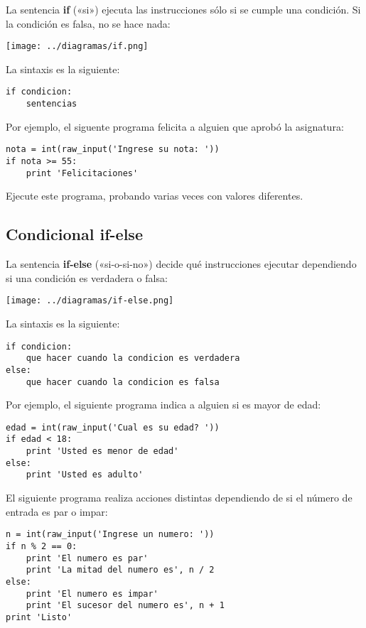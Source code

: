 La sentencia \textbf{if} («si») ejecuta las instrucciones sólo si se
cumple una condición. Si la condición es falsa, no se hace nada:

\texttt{[image: ../diagramas/if.png]}

La sintaxis es la siguiente:

\begin{lstlisting}
if condicion:
    sentencias
\end{lstlisting}

Por ejemplo, el siguente programa felicita a alguien que aprobó la
asignatura:

\begin{lstlisting}
nota = int(raw_input('Ingrese su nota: '))
if nota >= 55:
    print 'Felicitaciones'
\end{lstlisting}

Ejecute este programa, probando varias veces con valores diferentes.

\subsection{Condicional if-else}

La sentencia \textbf{if-else} («si-o-si-no») decide qué instrucciones
ejecutar dependiendo si una condición es verdadera o falsa:

\texttt{[image: ../diagramas/if-else.png]}

La sintaxis es la siguiente:

\begin{lstlisting}
if condicion:
    que hacer cuando la condicion es verdadera
else:
    que hacer cuando la condicion es falsa
\end{lstlisting}

Por ejemplo, el siguiente programa indica a alguien si es mayor de edad:

\begin{lstlisting}
edad = int(raw_input('Cual es su edad? '))
if edad < 18:
    print 'Usted es menor de edad'
else:
    print 'Usted es adulto'
\end{lstlisting}

El siguiente programa realiza acciones distintas dependiendo de si el
número de entrada es par o impar:

\begin{lstlisting}
n = int(raw_input('Ingrese un numero: '))
if n % 2 == 0:
    print 'El numero es par'
    print 'La mitad del numero es', n / 2
else:
    print 'El numero es impar'
    print 'El sucesor del numero es', n + 1
print 'Listo'
\end{lstlisting}


